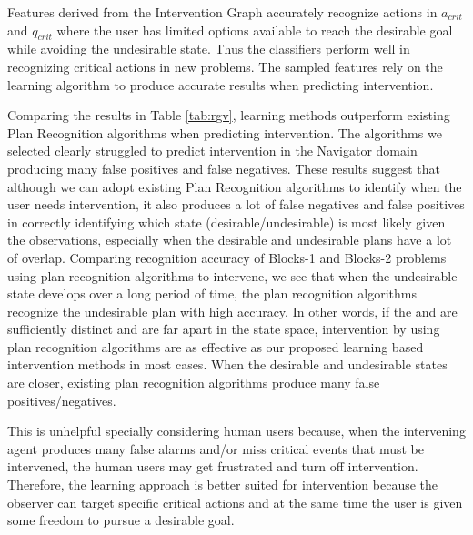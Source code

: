 Features derived from the Intervention Graph accurately recognize actions in $a_{crit}$ and $q_{crit}$ where the user has limited options available to reach the desirable goal while avoiding the undesirable state. 
Thus the classifiers perform well in recognizing critical actions in new problems. 
The sampled features rely on the learning algorithm to produce accurate results when predicting intervention. 

Comparing the results in Table \ref{tab:rgv}, learning methods outperform existing Plan Recognition algorithms when predicting intervention. 
The algorithms we selected clearly struggled to predict intervention in the Navigator domain producing many false positives and false negatives.
These results suggest that although we can adopt existing Plan Recognition algorithms to identify when the user needs intervention, it also produces a lot of false negatives and false positives in correctly identifying which state (desirable/undesirable) is most likely given the observations, especially when the desirable and undesirable plans have a lot of overlap.
Comparing recognition accuracy of Blocks-1 and Blocks-2 problems using plan recognition algorithms to intervene, we see that when the undesirable state develops over a long period of time, the plan recognition algorithms recognize the undesirable plan with high accuracy. 
In other words, if the \desired and \undesired are sufficiently distinct and are far apart in the state space, intervention by using plan recognition algorithms are as effective as our proposed learning based intervention methods in most cases.
When the desirable and undesirable states are closer, existing plan recognition algorithms produce many false positives/negatives.

This is unhelpful specially considering human users because, when the intervening agent produces many false alarms and/or miss critical events that must be intervened, the human users may get frustrated and turn off intervention.
Therefore, the learning approach is better suited for intervention because the observer can target specific critical actions  and at the same time the user is given some freedom to pursue a desirable goal.


